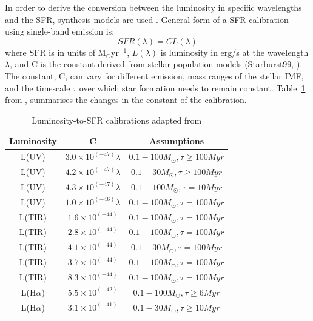 In order to derive the conversion between the luminosity in specific wavelengths and the SFR, synthesis models are used \citep{Kennicutt98b}. General form of a SFR calibration using single-band emission is: 
\begin{equation}
\label{equ: sfrsingle}
SFR(\lambda)= CL(\lambda)
\end{equation}
where SFR is in units of M${_\odot}$yr$^{-1}$, $L(\lambda)$ is luminosity in erg/s at the wavelength $\lambda$, and C is the constant derived from stellar population models (Starburst99, \cite{Leitherer99}). The constant, C, can vary for different emission, mass ranges of the stellar IMF, and the timescale $\tau$ over which star formation needs to remain constant. Table~\ref{table1} from \cite{Calzetti13}, summarises the changes in the constant of the calibration. 

\begin{table}[ht]
\caption{Luminosity-to-SFR calibrations adapted from \cite{Calzetti13}\label{table1}}
\centering
\begin{tabular}{ c c c }
\hline\hline
Luminosity\footnotemark{} & C\footnotemark{} & Assumptions\footnotemark{}\\
\hline
L(UV) & $3.0 \times 10^{(-47)} \lambda$ &$0.1 -100 M_{\odot}, \tau \ge 100 Myr $\\
L(UV) & $4.2 \times 10^{(-47)} \lambda$ &$0.1 -30 M_{\odot}, \tau \ge 100 Myr $\\
L(UV) & $4.3 \times 10^{(-47)}\lambda$ &$0.1 -100 M_{\odot}, \tau = 10 Myr $\\
L(UV) & $1.0 \times 10^{(-46)}\lambda$ &$0.1 -100 M_{\odot}, \tau = 100 Myr $\\
L(TIR) & $1.6 \times 10^{(-44)}$ &$0.1 -100 M_{\odot}, \tau = 100 Myr $\\
L(TIR) & $2.8 \times 10^{(-44)}$ &$0.1 -100 M_{\odot}, \tau = 100 Myr $\\
L(TIR) & $4.1 \times 10^{(-44)}$ &$0.1 -30 M_{\odot}, \tau = 100 Myr $\\
L(TIR) & $3.7 \times 10^{(-44)}$ &$0.1 -100 M_{\odot}, \tau = 100 Myr $\\
L(TIR) & $8.3 \times 10^{(-44)}$ &$0.1 -100 M_{\odot}, \tau = 100 Myr $\\
L(H${\alpha}$) & $5.5 \times 10^{(-42)}$&$0.1 -100 M_{\odot},  \tau \ge 6 Myr $\\
L(H${\alpha}$) & $3.1 \times 10^{(-41)}$&$0.1 -30 M_{\odot},  \tau \ge 10 Myr $\\
\hline
\end{tabular}
\end{table}


